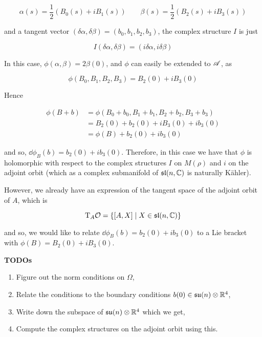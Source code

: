 \documentclass{report}
\newcommand{\su}{\mathfrak{su}}
\renewcommand{\sl}{\mathfrak{sl}}
\begin{document}
\[\alpha(s) = \frac12(B_0(s) + iB_1(s)) \qquad \beta(s) = \frac12(B_2(s) + iB_3(s))\]

and a tangent vector \((\delta\alpha, \delta\beta) = (b_0, b_1, b_2, b_3)\), the complex structure \(I\) is just

\[I(\delta\alpha, \delta\beta) = (i\delta\alpha, i\delta\beta)\]

In this case, \(\phi(\alpha, \beta) = 2\beta(0)\), and \(\phi\) can easily be extended to \(\mathscr{A}\), as

\[\phi(B_0, B_1, B_2, B_3) = B_2(0) + iB_3(0)\]

Hence

\begin{align*}
    \phi(B + b) &= \phi(B_0 + b_0, B_1 + b_1, B_2 + b_2, B_3 + b_3) \\
    &= B_2(0) + b_2(0) + iB_3(0) + ib_3(0) \\
    &= \phi(B) + b_2(0) + ib_3(0) 
\end{align*}

and so, \(\dd\phi_B(b) = b_2(0) + ib_3(0)\). Therefore, in this case we have that \(\phi\) is holomorphic with respect to the complex structures \(I\) on \(M(\rho)\) and \(i\) on the adjoint orbit (which as a complex submanifold of \(\sl(n, \C)\) is naturally K\"ahler).

However, we already have an expression of the tangent space of the adjoint orbit of \(A\), which is

\[\T_A\mcO = \left\{[A, X] \mid X \in \sl(n, \C)\right\}\]

and so, we would like to relate \(\dd\phi_B(b) = b_2(0) + ib_3(0)\) to a Lie bracket with \(\phi(B) = B_2(0) + iB_3(0)\).

\textbf{TODOs}

\begin{enumerate}
    \item Figure out the norm conditions on \(\Omega\),
    \item Relate the conditions to the boundary conditions \(b(0) \in \su(n) \otimes \R^4\),
    \item Write down the subspace of \(\su(n) \otimes \R^4\) which we get,
    \item Compute the complex structures on the adjoint orbit using this.
\end{enumerate}


\end{document}
